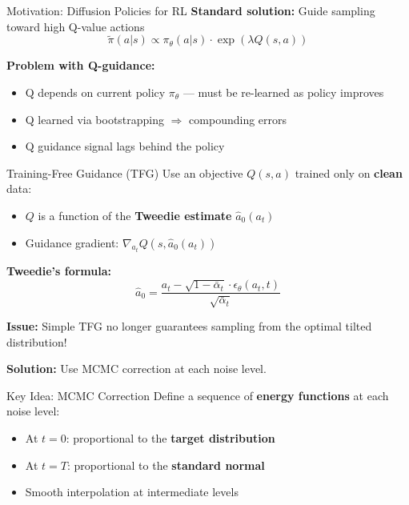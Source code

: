 \documentclass[final,hyperref={pdfpagelabels=false}]{beamer}
\newlength{\colwidth}
\begin{document}
\begin{frame}[t]
\begin{columns}[t]
\begin{column}{\colwidth}
\begin{block}{\Large Motivation: Diffusion Policies for RL}
\vspace{0.5em}
\textbf{Standard solution:} Guide sampling toward high Q-value actions
\[
\tilde{\pi}(a|s) \propto \pi_\theta(a|s) \cdot \exp(\lambda Q(s, a))
\]

\vspace{0.5em}
\textbf{Problem with Q-guidance:}
\begin{itemize}
    \item Q depends on current policy $\pi_\theta$ --- must be re-learned as policy improves
    \item Q learned via bootstrapping $\Rightarrow$ compounding errors
    \item Q guidance signal lags behind the policy
\end{itemize}
\end{block}

\vspace{1cm}

\begin{block}{\Large Training-Free Guidance (TFG)}
Use an objective $Q(s, a)$ trained only on \textbf{clean} data:
\begin{itemize}
    \item $Q$ is a function of the \textbf{Tweedie estimate} $\hat{a}_0(a_t)$
    \item Guidance gradient: $\nabla_{a_t} Q(s, \hat{a}_0(a_t))$
\end{itemize}

\vspace{0.5em}
\textbf{Tweedie's formula:}
\[
\hat{a}_0 = \frac{a_t - \sqrt{1-\bar{\alpha}_t} \cdot \epsilon_\theta(a_t, t)}{\sqrt{\bar{\alpha}_t}}
\]

\vspace{0.5em}
\textbf{Issue:} Simple TFG no longer guarantees sampling from the optimal tilted distribution!

\vspace{0.5em}
\textbf{Solution:} Use MCMC correction at each noise level.
\end{block}

\vspace{1cm}

\begin{block}{\Large Key Idea: MCMC Correction}
Define a sequence of \textbf{energy functions} at each noise level:
\begin{itemize}
    \item At $t=0$: proportional to the \textbf{target distribution}
    \item At $t=T$: proportional to the \textbf{standard normal}
    \item Smooth interpolation at intermediate levels
\end{itemize}


\end{block}
\end{column}
\end{columns}
\end{frame}
\end{document}
